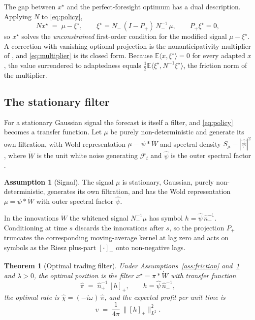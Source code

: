 \documentclass[11pt]{article}
\newcommand{\E}{\mathbb{E}}
\newcommand{\F}{\mathcal{F}}
\newcommand{\pluspart}[1]{\left[#1\right]_+}
\theoremstyle{plain}
\newtheorem{theorem}{Theorem}
\theoremstyle{definition}
\newtheorem{assumption}{Assumption}
\theoremstyle{remark}
\begin{document}
The gap between $x^\star$ and the perfect-foresight optimum has a dual description. Applying $N$ to \eqref{eq:policy},
\begin{equation}\label{eq:multiplier}
N x^\star \;=\; \mu - \xi^\star, \qquad
\xi^\star = N_-\,(I-P_+)\,N_-^{-1}\,\mu, \qquad P_+\xi^\star=0 ,
\end{equation}
so $x^\star$ solves the \emph{unconstrained} first-order condition for the modified signal $\mu-\xi^\star$. A correction with vanishing optional projection is the nonanticipativity multiplier of \citet{RockafellarWets1976}, and \eqref{eq:multiplier} is its closed form. Because $\E\langle x,\xi^\star\rangle=0$ for every adapted $x$, the value surrendered to adaptedness equals $\tfrac12\E\langle\xi^\star,N^{-1}\xi^\star\rangle$, the friction norm of the multiplier.

\subsection{The stationary filter}\label{sec:filter}

For a stationary Gaussian signal the forecast is itself a filter, and \eqref{eq:policy} becomes a transfer function. Let $\mu$ be purely non-deterministic and generate its own filtration, with Wold representation $\mu=\psi\ast\dot W$ and spectral density $S_\mu=|\hat\psi|^2$, where $\dot W$ is the unit white noise generating $\F_t$ and $\hat\psi$ is the outer spectral factor \citep{Wiener1949,Whittle1963}.

\begin{assumption}[Signal]\label{ass:signal}
The signal $\mu$ is stationary, Gaussian, purely non-deterministic, generates its own filtration, and has the Wold representation $\mu=\psi\ast\dot W$ with outer spectral factor $\hat\psi$.
\end{assumption}

In the innovations $\dot W$ the whitened signal $N_-^{-1}\mu$ has symbol $h=\hat\psi\,\hat n_-^{-1}$. Conditioning at time $s$ discards the innovations after $s$, so the projection $P_+$ truncates the corresponding moving-average kernel at lag zero and acts on symbols as the Riesz plus-part $\pluspart{\cdot}$ onto non-negative lags.

\begin{theorem}[Optimal trading filter]\label{thm:filter}
Under Assumptions~\ref{ass:friction} and~\ref{ass:signal} and $\lambda>0$, the optimal position is the filter $x^\star=\pi\ast\dot W$ with transfer function
\begin{equation}\label{eq:filter}
\hat\pi \;=\; \hat n_+^{-1}\,\pluspart{h}, \qquad h=\hat\psi\,\hat n_-^{-1},
\end{equation}
the optimal rate is $\hat\chi=(-i\omega)\,\hat\pi$, and the expected profit per unit time is
\begin{equation}\label{eq:value}
v \;=\; \frac{1}{4\pi}\,\bigl\|\pluspart{h}\bigr\|_{L^2}^2 .
\end{equation}
\end{theorem}
\end{document}
